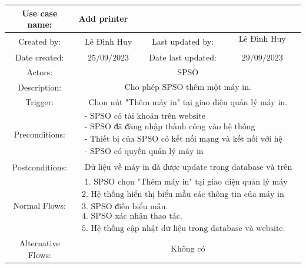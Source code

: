 \begin{tabular}{|c|c|c|c|}
\hline Use case name: & \multicolumn{3}{|l|}{ Add printer} \\
\hline Created by: & Lê Đình Huy & Last updated by: & $\begin{array}{l}\text { Lê Đình Huy } \\\end{array}$ \\
\hline Date created: & $25 / 09 / 2023$ & Date last updated: & $29 / 09 / 2023$\\
\hline Actors: & \multicolumn{3}{|c|}{ SPSO } \\
\hline Description: & \multicolumn{3}{|c|}{$\begin{array}{l}\text { Cho phép SPSO thêm một máy in. }\end{array}$} \\
\hline Trigger: & \multicolumn{3}{|c|}{ Chọn nút "Thêm máy in" tại giao diện quản lý máy in. } \\
\hline Preconditions: & \multicolumn{3}{|c|}{$\begin{array}{l}\text { - SPSO có tài khoản trên website } \\
\text { - SPSO đã đăng nhập thành công vào hệ thống } \\
\text { - Thiết bị của SPSO có kết nối mạng và kết nối với hệ thống }\\
\text { - SPSO có quyền quản lý máy in }\end{array}$} \\
\hline Postconditions: & \multicolumn{3}{|c|}{$\begin{array}{l}\text { Dữ liệu về máy in đã được update trong database và trên giao diện website.} \end{array}$} \\
\hline Normal Flows: & \multicolumn{3}{|c|}{$\begin{array}{l}\text { 1. SPSO chọn "Thêm máy in" tại giao diện quản lý máy in. } \\
\text {2. Hệ thống hiển thị biểu mẫu các thông tin của máy in mới. } \\
\text {3. SPSO điền biểu mẫu. } \\
\text {4. SPSO xác nhận thao tác. } \\
\text {5. Hệ thống cập nhật dữ liệu trong database và website. }\end{array}$} \\
\hline  Alternative Flows: & \multicolumn{3}{|c|}{$\begin{array}{l} 
\text {Không có}\end{array}$} \\

\end{tabular}
